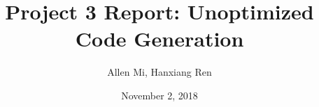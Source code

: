 \title{Project 3 Report: Unoptimized Code Generation}
\author{Allen Mi, Hanxiang Ren}
\date{November 2, 2018}
\newcommand{\reportfile}{scalars_report_3.tex}